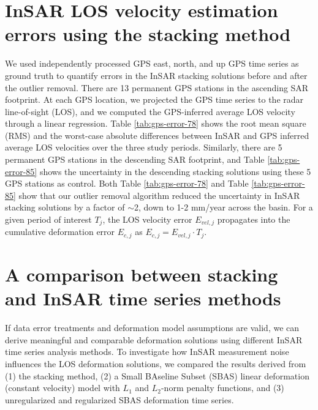 \documentclass[draft,grl]{agutexSI2019}
\begin{document}
\begin{article}
\section{InSAR LOS velocity estimation errors using the stacking method}
\label{sec:error-quant}
We used independently processed GPS east, north, and up GPS time series as ground truth to quantify errors in the InSAR stacking solutions before and after the outlier removal. There are 13 permanent GPS stations in the ascending SAR footprint. At each GPS location, we projected the GPS time series to the radar line-of-sight (LOS), and we computed the GPS-inferred average LOS velocity through a linear regression. Table \ref{tab:gps-error-78} shows the root mean square (RMS) and the worst-case absolute differences between InSAR and GPS inferred average LOS velocities over the three study periods. Similarly, there are 5 permanent GPS stations in the descending SAR footprint, and Table \ref{tab:gps-error-85} shows the uncertainty in the descending stacking solutions using these 5 GPS stations as control. Both Table \ref{tab:gps-error-78} and Table \ref{tab:gps-error-85} show that our outlier removal algorithm reduced the uncertainty in InSAR stacking solutions by a factor of $\sim$2, down to 1-2 mm/year across the basin. For a given period of interest $T_j$, the LOS velocity error $ E_{vel,j} $ propagates into the cumulative deformation error $ E_{c, j} $ as $ E_{c,j} = E_{vel,j} \cdot T_j $. 


\section{A comparison between stacking and InSAR time series methods}
\label{sec:method-compare}
If data error treatments and deformation model assumptions are valid, we can derive meaningful and comparable deformation solutions using different InSAR time series analysis methods. To investigate how InSAR measurement noise influences the LOS deformation solutions, we compared the results derived from (1) the stacking method, (2) a Small BAseline Subset (SBAS) linear deformation (constant velocity) model with $L_1$ and $L_2$-norm penalty functions, and (3) unregularized and regularized SBAS deformation time series. 


\end{article}
\end{document}
